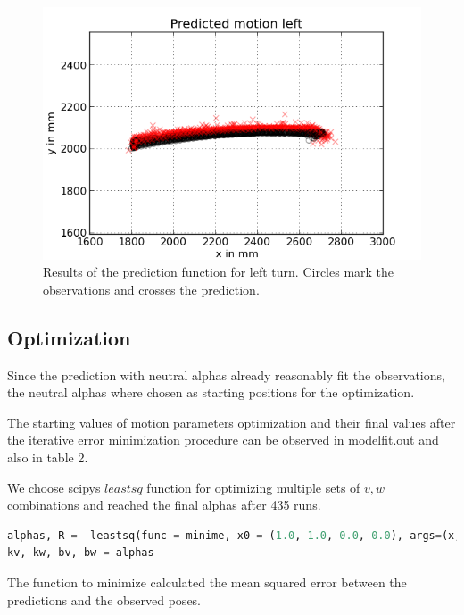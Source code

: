\documentclass{scrartcl}
\begin{document}
\begin{figure}[H]
\centering
\begin{minipage}{.5\textwidth}
  \centering
  \includegraphics[width=1\linewidth]{img/predictleft.png}
\end{minipage}%

\caption{Results of the prediction function for left turn. Circles mark the observations and crosses the prediction.}
\label{fig:prediction}
\end{figure}

\subsection{Optimization}

Since the prediction with neutral alphas already reasonably fit the observations, the neutral alphas where chosen as starting positions for the optimization.

The starting values of motion parameters optimization and their final values after the iterative error minimization procedure can be observed in modelfit.out and also in table 2. 


We choose scipys $leastsq$ function for optimizing multiple sets of $v, w$ combinations and reached the final alphas after 435 runs.
\begin{lstlisting}[language=Python]
alphas, R =  leastsq(func = minime, x0 = (1.0, 1.0, 0.0, 0.0), args=(x, y))
kv, kw, bv, bw = alphas
\end{lstlisting}
The function to minimize calculated the mean squared error between the predictions and the observed poses.
\end{document}
